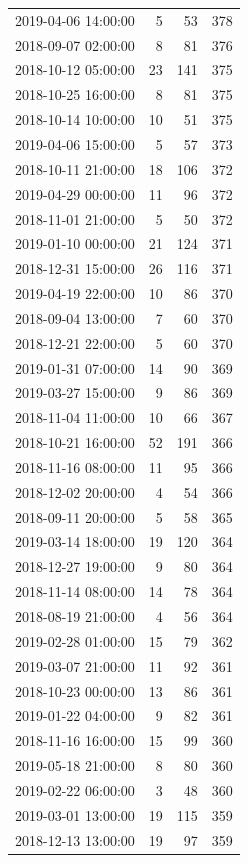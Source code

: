 \begin{tabular}{lrrr}
2019-04-06 14:00:00 & 5 & 53 & 378 \\
2018-09-07 02:00:00 & 8 & 81 & 376 \\
2018-10-12 05:00:00 & 23 & 141 & 375 \\
2018-10-25 16:00:00 & 8 & 81 & 375 \\
2018-10-14 10:00:00 & 10 & 51 & 375 \\
2019-04-06 15:00:00 & 5 & 57 & 373 \\
2018-10-11 21:00:00 & 18 & 106 & 372 \\
2019-04-29 00:00:00 & 11 & 96 & 372 \\
2018-11-01 21:00:00 & 5 & 50 & 372 \\
2019-01-10 00:00:00 & 21 & 124 & 371 \\
2018-12-31 15:00:00 & 26 & 116 & 371 \\
2019-04-19 22:00:00 & 10 & 86 & 370 \\
2018-09-04 13:00:00 & 7 & 60 & 370 \\
2018-12-21 22:00:00 & 5 & 60 & 370 \\
2019-01-31 07:00:00 & 14 & 90 & 369 \\
2019-03-27 15:00:00 & 9 & 86 & 369 \\
2018-11-04 11:00:00 & 10 & 66 & 367 \\
2018-10-21 16:00:00 & 52 & 191 & 366 \\
2018-11-16 08:00:00 & 11 & 95 & 366 \\
2018-12-02 20:00:00 & 4 & 54 & 366 \\
2018-09-11 20:00:00 & 5 & 58 & 365 \\
2019-03-14 18:00:00 & 19 & 120 & 364 \\
2018-12-27 19:00:00 & 9 & 80 & 364 \\
2018-11-14 08:00:00 & 14 & 78 & 364 \\
2018-08-19 21:00:00 & 4 & 56 & 364 \\
2019-02-28 01:00:00 & 15 & 79 & 362 \\
2019-03-07 21:00:00 & 11 & 92 & 361 \\
2018-10-23 00:00:00 & 13 & 86 & 361 \\
2019-01-22 04:00:00 & 9 & 82 & 361 \\
2018-11-16 16:00:00 & 15 & 99 & 360 \\
2019-05-18 21:00:00 & 8 & 80 & 360 \\
2019-02-22 06:00:00 & 3 & 48 & 360 \\
2019-03-01 13:00:00 & 19 & 115 & 359 \\
2018-12-13 13:00:00 & 19 & 97 & 359 \\

\end{tabular}
